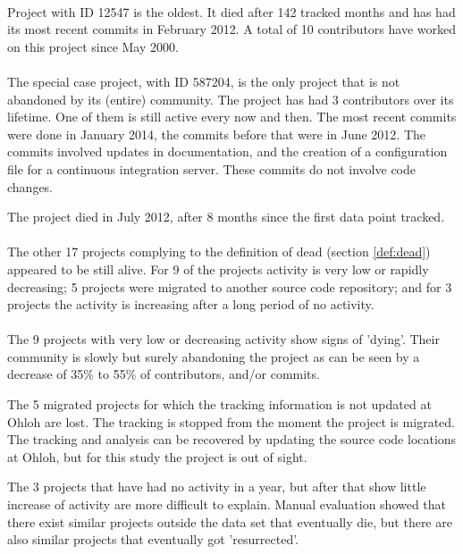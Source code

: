 \paragraph{}
Project with ID 12547 is the oldest. It died after 142 tracked months and has
had its most recent commits in February 2012. A total of 10 contributors have
worked on this project since May 2000.

\paragraph{}
The special case project, with ID 587204, is the only project that is not
abandoned by its (entire) community. The project has had 3 contributors over its
lifetime. One of them is still active every now and then. The most recent
commits were done in January 2014, the commits before that were in June 2012.
The commits involved updates in documentation, and the creation of a
configuration file for a continuous integration server. These commits do not
involve code changes.

The project died in July 2012, after 8 months since the first data point
tracked.

\paragraph{}
The other 17 projects complying to the definition of dead (section
\ref{def:dead}) appeared to be still alive. For 9 of the projects activity is
very low or rapidly decreasing; 5 projects were migrated to another source code
repository; and for 3 projects the activity is increasing after a long period of
no activity.

\paragraph{}
The 9 projects with very low or decreasing activity show signs of 'dying'. Their
community is slowly but surely abandoning the project as can be seen by a
decrease of 35\% to 55\% of contributors, and/or commits.

The 5 migrated projects for which the tracking information is not updated at
Ohloh are lost. The tracking is stopped from the moment the project is
migrated. The tracking and analysis can be recovered by updating the source
code locations at Ohloh, but for this study the project is out of sight.

The 3 projects that have had no activity in a year, but after that show little
increase of activity are more difficult to explain. Manual evaluation showed
that there exist similar projects outside the data set that eventually die, but
there are also similar projects that eventually got 'resurrected'.

